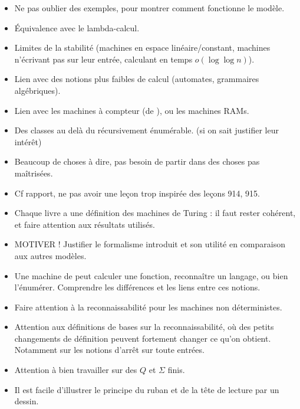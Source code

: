 \documentclass{agregfiche}
\begin{document}
\secidees

\begin{itemize}
        \item Ne pas oublier des exemples, pour montrer comment fonctionne le modèle.
        \item Équivalence avec le lambda-calcul.
        \item Limites de la stabilité (machines en espace linéaire/constant,
          machines n'écrivant pas sur leur entrée,
          calculant en temps $o(\log \log n)$).
	\item Lien avec des notions plus faibles de calcul (automates, grammaires
          algébriques).
	\item Lien avec les machines à compteur (de ), ou les machines RAMs.
        \item Des classes au delà du récursivement énumérable. (si on sait justifier leur intérêt)  %
\end{itemize}

\secpieges

\begin{itemize}
    \item Beaucoup de choses à dire, pas besoin de partir dans des choses pas maîtrisées.
    \item Cf rapport, ne pas avoir une leçon trop inspirée des leçons 914, 915.
    \item Chaque livre a une définition des machines de Turing : il faut rester cohérent, et faire attention aux résultats utilisés.
    \item MOTIVER ! Justifier le formalisme introduit et son utilité en comparaison
        aux autres modèles.
    \item Une machine de  peut calculer une fonction, reconnaître un langage, ou bien l'énumérer. Comprendre les différences et les liens entre ces notions.
    \item Faire attention à la reconnaissabilité pour les machines
        non déterministes.
    \item Attention aux définitions de bases sur la reconnaissabilité, où des petits changements de définition peuvent fortement changer ce qu'on obtient. Notamment sur les notions d'arrêt sur toute entrées.
     \item Attention à bien travailler sur des $Q$ et $\Sigma$
      finis.
      \item Il est facile d'illustrer le principe du ruban et de la tête de lecture par un dessin.
\end{itemize}
\end{document}
